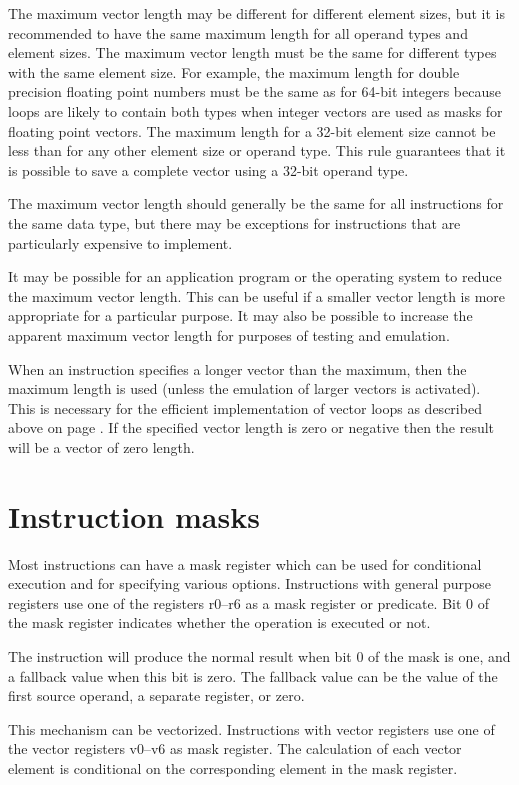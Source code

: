 \documentclass[forwardcom.tex]{subfiles}
\begin{document}
The maximum vector length may be different for different element sizes, but it is recommended to have the same maximum length for all operand types and element sizes.  The maximum vector length must be the same for different types with the same element size. For example, the maximum length for double precision floating point numbers must be the same as for 64-bit integers because loops are likely to contain both types when integer vectors are used as masks for floating point vectors. The maximum length for a 32-bit element size cannot be less than for any other element size or operand type. This rule guarantees that it is possible to save a complete vector using a 32-bit operand type.
\vv

The maximum vector length should generally be the same for all instructions for the same data type, but there may be exceptions for instructions that are particularly expensive to implement. 
\vv

It may be possible for an application program or the operating system to reduce the maximum vector length. This can be useful if a smaller vector length is more appropriate for a particular purpose. 
It may also be possible to increase the apparent maximum vector length for purposes of testing and emulation.
\vv

When an instruction specifies a longer vector than the maximum, then the maximum length is used (unless the emulation of larger vectors is activated). This is necessary for the efficient implementation of vector loops as described above on page \pageref{vectorLoops}.
If the specified vector length is zero or negative then the result will be a vector of zero length.

\section{Instruction masks}
Most instructions can have a mask register which can be used for conditional execution and for specifying various options. Instructions with general purpose registers use one of the registers r0--r6 as a mask register or predicate. Bit 0 of the mask register indicates whether the operation is executed or not.
\vv

The instruction will produce the normal result when bit 0 of the mask is one, and a fallback value when this bit is zero. The fallback value can be the value of the first source operand, a separate register, or zero.
\vv

This mechanism can be vectorized. Instructions with vector registers use one of the vector registers v0--v6 as mask register. The calculation of each vector element is conditional on the corresponding element in the mask register.
\vv
\end{document}
